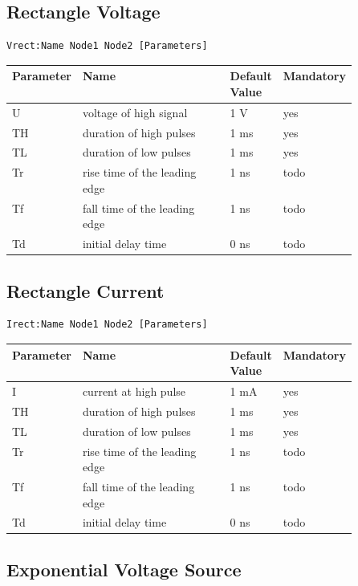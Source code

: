 \subsection{Rectangle Voltage}

\begin{verbatim}
Vrect:Name Node1 Node2 [Parameters]
\end{verbatim}


\begin{tabular}{|l|p{0.5\linewidth}|l|l|}
\hline
Parameter & Name & Default Value & Mandatory \\
\hline
U & voltage of high signal & 1 V & yes \\
TH & duration of high pulses & 1 ms & yes \\
TL & duration of low pulses & 1 ms & yes \\
Tr & rise time of the leading edge & 1 ns & todo \\
Tf & fall time of the leading edge & 1 ns & todo \\
Td & initial delay time & 0 ns & todo \\
\hline
\end{tabular}



\subsection{Rectangle Current}

\begin{verbatim}
Irect:Name Node1 Node2 [Parameters]
\end{verbatim}


\begin{tabular}{|l|p{0.5\linewidth}|l|l|}
\hline
Parameter & Name & Default Value & Mandatory \\
\hline
I & current at high pulse & 1 mA & yes \\
TH & duration of high pulses & 1 ms & yes \\
TL & duration of low pulses & 1 ms & yes \\
Tr & rise time of the leading edge & 1 ns & todo \\
Tf & fall time of the leading edge & 1 ns & todo \\
Td & initial delay time & 0 ns & todo \\
\hline
\end{tabular}


\subsection{Exponential Voltage Source}

